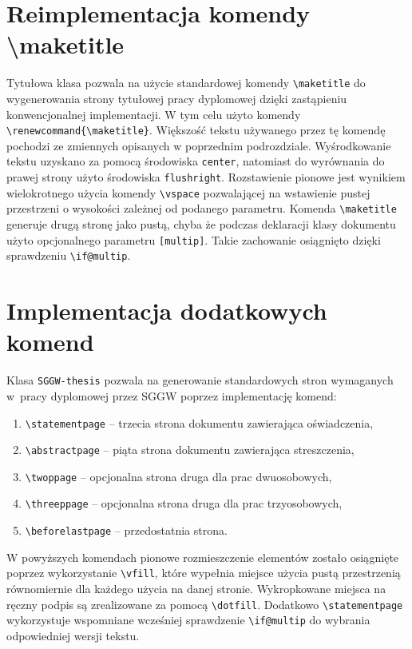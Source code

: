 \documentclass{SGGW-thesis}
\begin{document}
\section{Reimplementacja komendy \textbackslash maketitle}
\label{sec:maketitle}
Tytułowa klasa pozwala na użycie standardowej komendy \verb|\maketitle| do wygenerowania strony tytułowej pracy dyplomowej dzięki zastąpieniu konwencjonalnej implementacji.
W tym celu użyto komendy \verb|\renewcommand{\maketitle}|.
Większość tekstu używanego przez tę komendę pochodzi ze zmiennych opisanych w poprzednim podrozdziale. Wyśrodkowanie tekstu uzyskano za pomocą środowiska \verb|center|, natomiast do wyrównania do prawej strony użyto środowiska \verb|flushright|. Rozstawienie pionowe jest wynikiem wielokrotnego użycia komendy \verb|\vspace| pozwalającej na wstawienie pustej przestrzeni o wysokości zależnej od podanego parametru. Komenda \verb|\maketitle| generuje drugą stronę jako pustą, chyba że podczas deklaracji klasy dokumentu użyto opcjonalnego parametru \verb|[multip]|. Takie zachowanie osiągnięto dzięki sprawdzeniu \verb|\if@multip|.


\section{Implementacja dodatkowych komend}
\label{sec:implementacja-dodatkowych}
Klasa {\tt SGGW-thesis} pozwala na generowanie standardowych stron wymaganych w~pracy dyplomowej przez SGGW poprzez implementację komend:
\begin{enumerate}[label=\alph*.,itemsep=0pt]
\item{\verb|\statementpage| -- trzecia strona dokumentu zawierająca oświadczenia,}
\item{\verb|\abstractpage| -- piąta strona dokumentu zawierająca streszczenia,}
\item{\verb|\twoppage| -- opcjonalna strona druga dla prac dwuosobowych,}
\item{\verb|\threeppage| -- opcjonalna strona druga dla prac trzyosobowych,}
\item{\verb|\beforelastpage| -- przedostatnia strona.}
\end{enumerate}
W powyższych komendach pionowe rozmieszczenie elementów zostało osiągnięte poprzez wykorzystanie \verb|\vfill|, które wypełnia miejsce użycia pustą przestrzenią równomiernie dla każdego użycia na danej stronie. Wykropkowane miejsca na ręczny podpis są zrealizowane za pomocą \verb|\dotfill|. Dodatkowo \verb|\statementpage| wykorzystuje wspomniane wcześniej sprawdzenie \verb|\if@multip| do wybrania odpowiedniej wersji tekstu.
\end{document}

